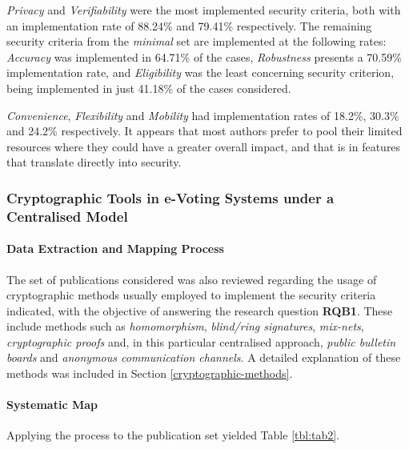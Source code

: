 \documentclass[../access.tex]{subfiles}
\begin{document}
	\par
    \textit{Privacy} and \textit{Verifiability} were the most implemented security criteria, both with an implementation rate of 88.24\% and 79.41\% respectively. The remaining security criteria from the \textit{minimal} set are implemented at the following rates: \textit{Accuracy} was implemented in 64.71\% of the cases, \textit{Robustness} presents a 70.59\% implementation rate, and \textit{Eligibility} was the least concerning security criterion, being implemented in just 41.18\% of the cases considered.
    \par
    \textit{Convenience}, \textit{Flexibility} and \textit{Mobility} had implementation rates of 18.2\%, 30.3\% and 24.2\% respectively. It appears that most authors prefer to pool their limited resources where they could have a greater overall impact, and that is in features that translate directly into security.
    
    \subsubsection{Cryptographic Tools in e-Voting Systems under a Centralised Model}

    \paragraph{Data Extraction and Mapping Process}
        The set of publications considered was also reviewed regarding the usage of cryptographic methods usually employed to implement the security criteria indicated, with the objective of answering the research question \textbf{RQB1}. These include methods such as \textit{homomorphism}, \textit{blind/ring signatures}, \textit{mix-nets}, \textit{cryptographic proofs} and, in this particular centralised approach, \textit{public bulletin boards} and \textit{anonymous communication channels}. A detailed explanation of these methods was included in Section \ref{cryptographic-methods}.
    
    \paragraph{Systematic Map}
        Applying the process to the publication set yielded Table \ref{tbl:tab2}.
    
\end{document}
